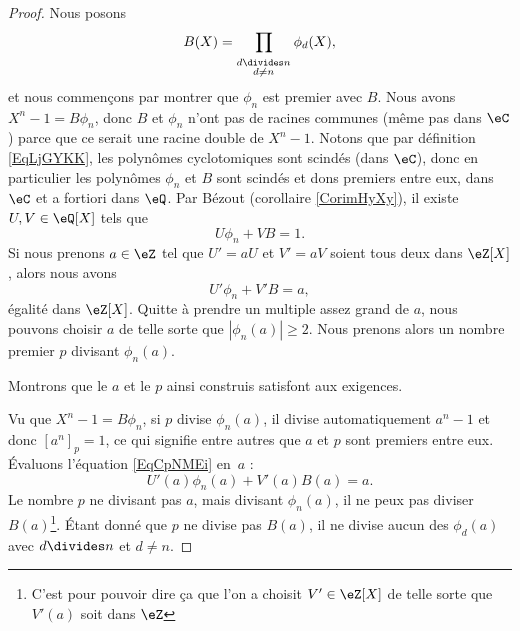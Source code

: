 \begin{proof}
    Nous posons
    \begin{equation}
        B(X)=\prod_{_{\substack{d\divides n\\d\neq n}}}\phi_d(X),
    \end{equation}
    et nous commençons par montrer que \( \phi_n\) est premier avec \( B\). Nous avons \( X^n-1=B\phi_n\), donc \( B\) et \( \phi_n\) n'ont pas de racines communes (même pas dans \( \eC\)) parce que ce serait une racine double de \( X^n-1\). Notons que par définition \ref{EqLjGYKK}, les polynômes cyclotomiques sont scindés (dans \( \eC\)), donc en particulier les polynômes \( \phi_n\) et \( B\) sont scindés et dons premiers entre eux, dans \( \eC\) et a fortiori dans \( \eQ\). Par Bézout (corollaire \ref{CorimHyXy}), il existe \( U,V\in\eQ[X]\) tels que
    \begin{equation}
        U\phi_n+VB=1.
    \end{equation}
    Si nous prenons \( a\in \eZ\) tel que \( U'=aU\) et \( V'=aV\) soient tous deux dans \( \eZ[X]\), alors nous avons
    \begin{equation}    \label{EqCpNMEi}
        U'\phi_n+V'B=a,
    \end{equation}
    égalité dans \( \eZ[X]\). Quitte à prendre un multiple assez grand de \( a\), nous pouvons choisir \( a\) de telle sorte que \( | \phi_n(a) |\geq 2\). Nous prenons alors un nombre premier \( p\) divisant \( \phi_n(a)\). 

    Montrons que le \( a\) et le \( p\) ainsi construis satisfont aux exigences.

    Vu que \( X^n-1=B\phi_n\), si \( p\) divise \( \phi_n(a)\), il divise automatiquement \( a^n-1\) et donc \( [a^n]_p=1\), ce qui signifie entre autres que \( a\) et \( p\) sont premiers entre eux. Évaluons l'équation \eqref{EqCpNMEi} en~\( a\) :
    \begin{equation}
        U'(a)\phi_n(a)+V'(a)B(a)=a.
    \end{equation}
    Le nombre \( p\) ne divisant pas \( a\), mais divisant \( \phi_n(a)\), il ne peux pas diviser \( B(a)\)\footnote{C'est pour pouvoir dire ça que l'on a choisit \( V'\in \eZ[X]\) de telle sorte que \( V'(a)\) soit dans \( \eZ\)}. Étant donné que \( p\) ne divise pas \( B(a)\), il ne divise aucun des \( \phi_d(a)\) avec \( d\divides n\) et \( d\neq n\).


\end{proof}
